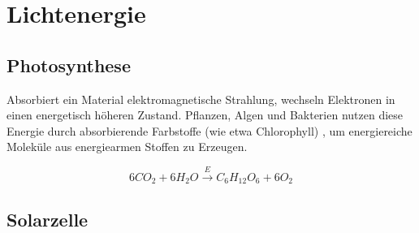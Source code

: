 \section{Lichtenergie}
\subsection{Photosynthese}
Absorbiert ein Material elektromagnetische Strahlung, wechseln Elektronen in einen energetisch höheren Zustand. Pflanzen, Algen und Bakterien nutzen diese Energie durch absorbierende Farbstoffe (wie etwa Chlorophyll) , um energiereiche Moleküle aus energiearmen Stoffen zu Erzeugen.

$$6CO_2 + 6H_2O \xrightarrow{E} C_6H_{12}O_6 + 6O_2$$

\subsection{Solarzelle}

